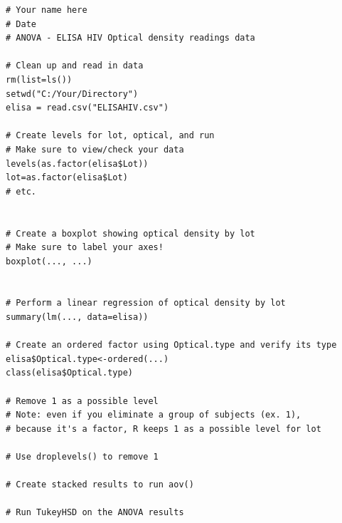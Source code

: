 \documentclass[11pt]{article}
\begin{document}
\begin{verbatim}
# Your name here
# Date
# ANOVA - ELISA HIV Optical density readings data

# Clean up and read in data
rm(list=ls())
setwd("C:/Your/Directory")
elisa = read.csv("ELISAHIV.csv")

# Create levels for lot, optical, and run
# Make sure to view/check your data
levels(as.factor(elisa$Lot))
lot=as.factor(elisa$Lot)
# etc.


# Create a boxplot showing optical density by lot
# Make sure to label your axes!
boxplot(..., ...)


# Perform a linear regression of optical density by lot
summary(lm(..., data=elisa))

# Create an ordered factor using Optical.type and verify its type
elisa$Optical.type<-ordered(...)
class(elisa$Optical.type)

# Remove 1 as a possible level
# Note: even if you eliminate a group of subjects (ex. 1),
# because it's a factor, R keeps 1 as a possible level for lot

# Use droplevels() to remove 1

# Create stacked results to run aov()

# Run TukeyHSD on the ANOVA results

\end{verbatim}
\end{document}
